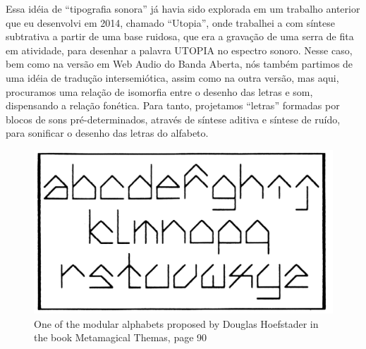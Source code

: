 Essa idéia de ``tipografia sonora'' já havia sido explorada em um trabalho anterior que eu desenvolvi em 2014, chamado ``Utopia'', onde trabalhei a com síntese subtrativa a partir de uma base ruidosa, que era a gravação de uma serra de fita em atividade, para desenhar a palavra UTOPIA no espectro sonoro. Nesse caso, bem como na versão em Web Audio do Banda Aberta, nós também partimos de uma idéia de tradução intersemiótica, assim como na outra versão, mas aqui, procuramos uma relação de isomorfia entre o desenho das letras e som, dispensando a relação fonética. Para tanto, projetamos ``letras'' formadas por blocos de sons pré-determinados, através de síntese aditiva e síntese de ruído, para sonificar o desenho das letras do alfabeto.







\begin{figure}[!ht]
    \centering
        \includegraphics[width=1\linewidth]{pictures/metamagical}
        \vspace{-10pt}
    \caption{One of the modular alphabets proposed by Douglas Hoefstader in the book Metamagical Themas, page 90}
    \label{fig:metamagical}
\end{figure} 

